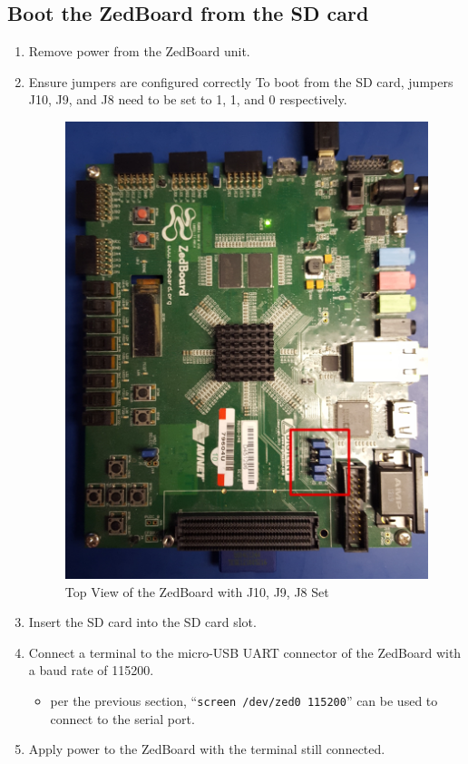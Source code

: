 \subsection*{Boot the ZedBoard from the SD card}
\begin{enumerate}
\item Remove power from the ZedBoard unit.
\item Ensure jumpers are configured correctly
\subitem To boot from the SD card, jumpers J10, J9, and J8 need to be set to 1, 1, and 0 respectively.
\begin{figure}[ht]
	\centerline{\includegraphics[scale=0.15]{zed_top}}
	\caption{Top View of the ZedBoard with J10, J9, J8 Set}
	\label{fig:zed_top}
\end{figure}
\item Insert the SD card into the SD card slot.
\item Connect a terminal to the micro-USB UART connector of the ZedBoard with a baud rate of 115200.
\begin{itemize}
\item per the previous section, ``\texttt{screen /dev/zed0 115200}'' can be used to connect to the serial port.
\end{itemize}
\item Apply power to the ZedBoard with the terminal still connected.
\end{enumerate}

